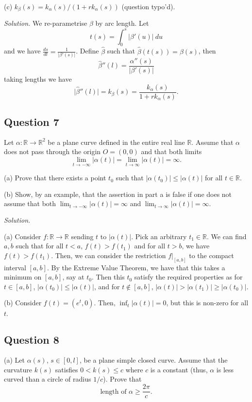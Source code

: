 \documentclass[12pt]{article}
\begin{document}
(c) \(k_\beta(s) = k_\alpha(s)/(1+r k_\alpha(s))\) (question typo'd).

\textit{Solution.}
We re-parametrise \(\beta\) by arc length.
Let \[t(s) = \int_0^s \lvert \beta'(u) \rvert\ du\]
and we have \(\frac{ds}{dt} = \frac{1}{\lvert \beta'(s)\rvert}\).
Define \(\hat{\beta}\) such that \(\hat{\beta}(t(s)) = \beta(s)\), then
\[\hat{\beta}''(l) = \frac{\alpha''(s)}{\lvert \beta'(s) \rvert} \]
taking lengths we have
\[\lvert \hat{\beta}''(l) \rvert = k_\beta(s) = \frac{k_\alpha(s)}{1 + rk_\alpha(s)}. \]

\subsection*{Question 7}

Let $\alpha : \mathbb R \to \mathbb R^2$ be a plane curve
defined in the entire real line $\mathbb R$.
Assume that $\alpha$ does not pass through
the origin $O = (0,0)$ and that both limits
$$\lim_{t\to -\infty} |\alpha(t)| = \lim_{t\to \infty} |\alpha(t)| = \infty.$$

(a) Prove that there exists a point $t_0$ such that $|\alpha(t_0)| \leq |\alpha(t)|$ for all $t \in \mathbb R.$

(b) Show, by an example, that the assertion in part a is false
if one does not assume that both $\lim_{t \to -\infty}|\alpha(t)| = \infty$ and $\lim_{t \to \infty}|\alpha(t)| = \infty$.

\textit{Solution.}

(a) Consider $f : \mathbb{R} \to \mathbb{R}$ sending $t$ to $|\alpha(t)|.$
Pick an arbitrary $t_1 \in \mathbb{R}$. We can find $a, b$ such that for all $t < a$,
$f(t) > f(t_1)$ and for all $t > b$, we have $f(t) > f(t_1).$ Then, we can consider
the restriction $f|_{[a,b]}$ to the compact interval $[a,b]$. By the Extreme Value Theorem,
we have that this takes a minimum on $[a, b]$, say at $t_0$. Then this $t_0$ satisfy the required properties
as for $t \in [a,b]$, $|\alpha(t_0)| \leq |\alpha(t)|$, and for $t \not \in [a,b]$, $|\alpha(t)| > |\alpha(t_1)| \geq |\alpha(t_0)|$.

(b) Consider $f(t) = (e^t, 0).$ Then, $\inf_t |\alpha(t)| = 0$, but this is non-zero for all $t$.

\subsection*{Question 8}

(a) Let \(\alpha(s)\), \(s\in[0,l]\), be a plane simple closed curve.
Assume that the curvature \(k(s)\) satisfies \(0<k(s)\leq c\) where \(c\) is a constant
(thus, \(\alpha\) is less curved than a circle of radius \(1/c\)). Prove that
\[ \text{length of }\alpha \geq \frac{2\pi}{c} . \]
\end{document}
